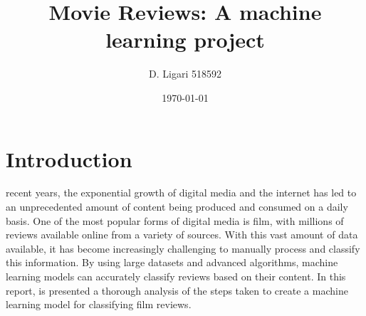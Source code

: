 \documentclass[eng]{class}
\title{Movie Reviews: A machine learning project}
\author[1]{D. Ligari 518592}
\affil[1]{University of Pavia, Department of Computer Engineering (Data Science), Pavia, Italy}
\date{\today}
\begin{document}
\maketitle
\thispagestyle{FirstPage}
\section{Introduction}
recent years, the exponential growth of digital media and the internet has led to an unprecedented amount of content being produced and consumed on a daily basis.
One of the most popular forms of digital media is film, with millions of reviews available online from a variety of sources. With this vast amount of data available,
it has become increasingly challenging to manually process and classify this information.
By using large datasets and advanced algorithms, machine learning models can accurately classify reviews based on their content.
In this report, is presented a thorough analysis of the steps taken to create a machine learning model for classifying film reviews.
\end{document}
